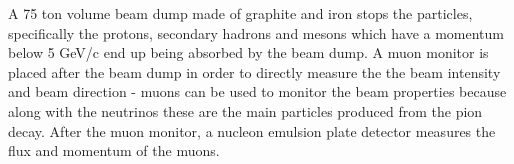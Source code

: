 A 75 ton volume beam dump made of graphite and iron stops the particles, specifically the protons, secondary hadrons and mesons which have a momentum below 5 GeV/c end up being absorbed by the beam dump. A muon monitor is placed after the beam dump in order to directly measure the the beam intensity and beam direction - muons can be used to monitor the beam properties because along with the neutrinos these are the main particles produced from the pion decay. After the muon monitor, a nucleon emulsion plate detector measures the flux and momentum of the muons. 



